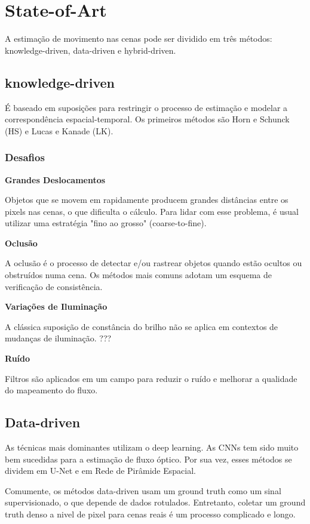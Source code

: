 \documentclass[12pt, a4paper]{article}
\begin{document}
\section{State-of-Art}

A estimação de movimento nas cenas pode ser dividido em três métodos: knowledge-driven, data-driven e hybrid-driven. 

\subsection{knowledge-driven}

É baseado em suposições para restringir o processo de estimação e modelar a correspondência espacial-temporal. Os primeiros métodos são Horn e Schunck (HS) e Lucas e Kanade (LK). 

\subsubsection{Desafios}

\textbf{Grandes Deslocamentos}

Objetos que se movem em rapidamente producem grandes distâncias entre os pixels nas cenas, o que dificulta o cálculo. Para lidar com esse problema, é usual utilizar uma estratégia "fino ao grosso" (coarse-to-fine).

\textbf{Oclusão}

A oclusão é o processo de detectar e/ou rastrear objetos quando estão ocultos ou obstruídos numa cena. Os métodos mais comuns adotam um esquema de verificação de consistência.

\textbf{Variações de Iluminação}

A clássica suposição de constância do brilho não se aplica em contextos de mudanças de iluminação. ???

\textbf{Ruído}

Filtros são aplicados em um campo para reduzir o ruído e melhorar a qualidade do mapeamento do fluxo.

\subsection{Data-driven}

As técnicas mais dominantes utilizam o deep learning. As CNNs tem sido muito bem sucedidas para a estimação de fluxo óptico. Por sua vez, esses métodos se dividem em U-Net e em Rede de Pirâmide Espacial.

Comumente, os métodos data-driven usam um ground truth como um sinal supervisionado, o que depende de dados rotulados. Entretanto, coletar um ground truth denso a nivel de pixel para cenas reais é um processo complicado e longo.
\end{document}
